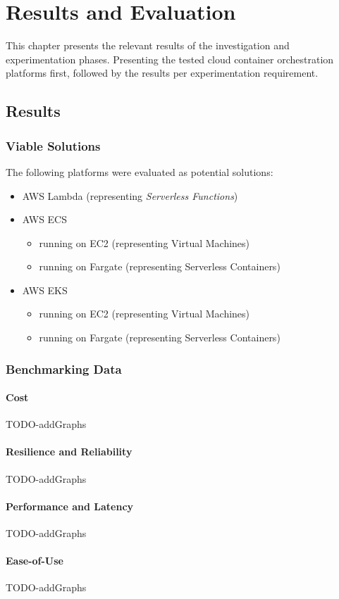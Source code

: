 \part{Results and Evaluation}

This chapter presents the relevant results of the investigation and experimentation phases.
Presenting the tested cloud container orchestration platforms first,
followed by the results per experimentation requirement.

\chapter{Results}

\section{Viable Solutions}
The following platforms were evaluated as potential solutions:
\begin{itemize}
  \item AWS Lambda (representing \textit{Serverless Functions})
  \item AWS ECS
        \begin{itemize}
          \item running on EC2 (representing Virtual Machines)
          \item running on Fargate (representing Serverless Containers)
        \end{itemize}
  \item AWS EKS
        \begin{itemize}
          \item running on EC2 (representing Virtual Machines)
          \item running on Fargate (representing Serverless Containers)
        \end{itemize}
\end{itemize}

\section{Benchmarking Data}

\subsection{Cost}
TODO-addGraphs
\subsection{Resilience and Reliability}
TODO-addGraphs
\subsection{Performance and Latency}
TODO-addGraphs
\subsection{Ease-of-Use}
TODO-addGraphs
